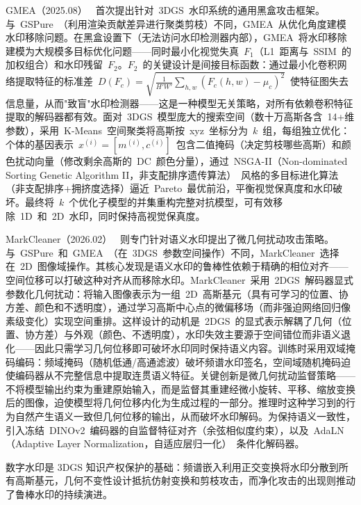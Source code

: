 GMEA（2025.08）~\cite{2508_07263} 首次提出针对~3DGS~水印系统的通用黑盒攻击框架。与~GSPure~（利用渲染贡献差异进行聚类剪枝）不同，GMEA~从优化角度建模水印移除问题。在黑盒设置下（无法访问水印检测器内部），GMEA~将水印移除建模为大规模多目标优化问题——同时最小化视觉失真~$F_1$（L1~距离与~SSIM~的加权组合）和水印残留~$F_2$。$F_2$~的关键设计是间接目标函数：通过最小化卷积网络提取特征的标准差~$D(F_c) = \sqrt{\frac{1}{H'W'}\sum_{h,w}(F_c(h,w) - \mu_c)^2}$~使特征图失去信息量，从而"致盲"水印检测器——这是一种模型无关策略，对所有依赖卷积特征提取的解码器都有效。面对~3DGS~模型庞大的搜索空间（数十万高斯各含~14+维参数），采用~K-Means~空间聚类将高斯按~xyz~坐标分为~$k$~组，每组独立优化：个体的基因表示~$x^{(i)} = [m^{(i)}, c^{(i)}]$~包含二值掩码（决定剪枝哪些高斯）和颜色扰动向量（修改剩余高斯的~DC~颜色分量），通过~NSGA-II（Non-dominated Sorting Genetic Algorithm II，非支配排序遗传算法）~风格的多目标进化算法（非支配排序+拥挤度选择）逼近~Pareto~最优前沿，平衡视觉保真度和水印破坏。最终将~$k$~个优化子模型的并集重构完整对抗模型，可有效移除~1D~和~2D~水印，同时保持高视觉保真度。

MarkCleaner（2026.02）~\cite{2602_01513} 则专门针对语义水印提出了微几何扰动攻击策略。与~GSPure~和~GMEA~（在~3DGS~参数空间操作）不同，MarkCleaner~选择在~2D~图像域操作。其核心发现是语义水印的鲁棒性依赖于精确的相位对齐——空间位移可以打破这种对齐从而移除水印。MarkCleaner~采用~2DGS~解码器显式参数化几何扰动：将输入图像表示为一组~2D~高斯基元（具有可学习的位置、协方差、颜色和不透明度），通过学习高斯中心点的微偏移场（而非强迫网络回归像素级变化）实现空间重排。这样设计的动机是~2DGS~的显式表示解耦了几何（位置、协方差）与外观（颜色、不透明度），水印失效主要源于空间错位而非语义退化——因此只需学习几何位移即可破坏水印同时保持语义内容。训练时采用双域掩码编码：频域掩码（随机低通/高通滤波）破坏频谱水印签名，空间域随机掩码迫使编码器从不完整信息中提取连贯语义特征。关键创新是微几何扰动监督策略——不将模型输出约束为重建原始输入，而是监督其重建经微小旋转、平移、缩放变换后的图像，迫使模型将几何位移内化为生成过程的一部分。推理时这种学习到的行为自然产生语义一致但几何位移的输出，从而破坏水印解码。为保持语义一致性，引入冻结~DINOv2~编码器的自监督特征对齐（余弦相似度约束），以及~AdaLN（Adaptive Layer Normalization，自适应层归一化）~条件化解码器。

\begin{takeaway}
数字水印是 3DGS 知识产权保护的基础：频谱嵌入利用正交变换将水印分散到所有高斯基元，几何不变性设计抵抗仿射变换和剪枝攻击，而净化攻击的出现则推动了鲁棒水印的持续演进。
\end{takeaway}


